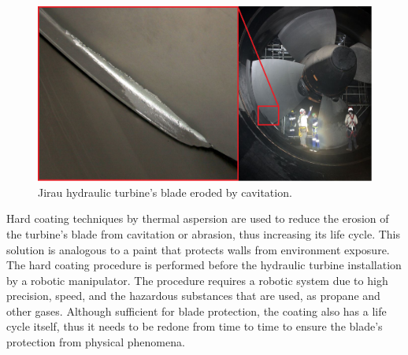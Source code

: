 \begin{figure}[h!]	
	\includegraphics[width=\columnwidth]{figs/intro/cavitacao2.png}
	\caption{Jirau hydraulic turbine's blade eroded by cavitation.}
	\label{fig::cavitacao}
\end{figure}

Hard coating techniques by thermal aspersion
are used to reduce the erosion of the turbine's blade from cavitation or
abrasion, thus increasing its life cycle. This solution is analogous to a paint
that protects walls from environment exposure. The hard coating procedure is performed
before the hydraulic turbine installation by a robotic manipulator. The
procedure requires a robotic system due to high precision, speed, and
the hazardous substances that are used, as propane and other gases.
Although sufficient for blade protection, the coating also has a life
cycle itself, thus it needs to be redone from time to time to ensure the
blade's protection from physical phenomena.

